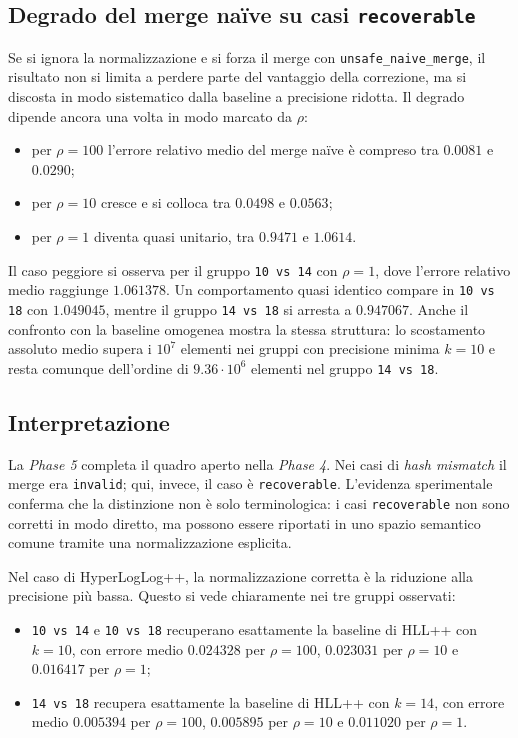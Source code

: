 \subsection{Degrado del merge naïve su casi \texttt{recoverable}}

Se si ignora la normalizzazione e si forza il merge con
\texttt{unsafe\_naive\_merge}, il risultato non si limita a perdere parte del
vantaggio della correzione, ma si discosta in modo sistematico dalla baseline a
precisione ridotta. Il degrado dipende ancora una volta in modo marcato da
\(\rho\):
\begin{itemize}
    \item per \(\rho = 100\) l'errore relativo medio del merge naïve è compreso
    tra \(0.0081\) e \(0.0290\);
    \item per \(\rho = 10\) cresce e si colloca tra \(0.0498\) e \(0.0563\);
    \item per \(\rho = 1\) diventa quasi unitario, tra \(0.9471\) e
    \(1.0614\).
\end{itemize}

Il caso peggiore si osserva per il gruppo \texttt{10 vs 14} con \(\rho = 1\),
dove l'errore relativo medio raggiunge \(1.061378\). Un comportamento quasi
identico compare in \texttt{10 vs 18} con \(1.049045\), mentre il gruppo
\texttt{14 vs 18} si arresta a \(0.947067\). Anche il confronto con la baseline
omogenea mostra la stessa struttura: lo scostamento assoluto medio supera i
\(10^7\) elementi nei gruppi con precisione minima \(k=10\) e resta comunque
dell'ordine di \(9.36 \cdot 10^6\) elementi nel gruppo \texttt{14 vs 18}.

\subsection{Interpretazione}

La \emph{Phase 5} completa il quadro aperto nella \emph{Phase 4}. Nei casi di
\emph{hash mismatch} il merge era \texttt{invalid}; qui, invece, il caso è
\texttt{recoverable}. L'evidenza sperimentale conferma che la distinzione non è
solo terminologica: i casi \texttt{recoverable} non sono corretti in modo
diretto, ma possono essere riportati in uno spazio semantico comune tramite una
normalizzazione esplicita.

Nel caso di HyperLogLog++, la normalizzazione corretta è la riduzione alla
precisione più bassa. Questo si vede chiaramente nei tre gruppi osservati:
\begin{itemize}
    \item \texttt{10 vs 14} e \texttt{10 vs 18} recuperano esattamente la
    baseline di HLL++ con \(k=10\), con errore medio \(0.024328\) per
    \(\rho=100\), \(0.023031\) per \(\rho=10\) e \(0.016417\) per \(\rho=1\);
    \item \texttt{14 vs 18} recupera esattamente la baseline di HLL++ con
    \(k=14\), con errore medio \(0.005394\) per \(\rho=100\),
    \(0.005895\) per \(\rho=10\) e \(0.011020\) per \(\rho=1\).
\end{itemize}

